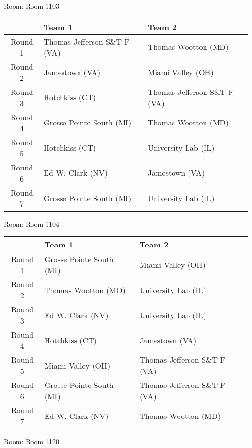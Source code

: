 \documentclass{article}%
\begin{document}
\vspace*{8pt}%
\linebreak%
\begin{flushleft}%
\begin{Large}%
Room: Room 1103%
\end{Large}%
\end{flushleft}%
\begin{tabularx}{\textwidth}{|c|Y|Y|}%
\hline%
&Team 1&Team 2\\%
\hline%
Round 1&Thomas Jefferson S\&T F (VA)&Thomas Wootton (MD)\\%
Round 2&Jamestown (VA)&Miami Valley (OH)\\%
Round 3&Hotchkiss (CT)&Thomas Jefferson S\&T F (VA)\\%
Round 4&Grosse Pointe South (MI)&Thomas Wootton (MD)\\%
Round 5&Hotchkiss (CT)&University Lab (IL)\\%
Round 6&Ed W. Clark (NV)&Jamestown (VA)\\%
Round 7&Grosse Pointe South (MI)&University Lab (IL)\\%
\hline%
\end{tabularx}%
\vspace*{8pt}%
\linebreak%
\begin{flushleft}%
\begin{Large}%
Room: Room 1104%
\end{Large}%
\end{flushleft}%
\begin{tabularx}{\textwidth}{|c|Y|Y|}%
\hline%
&Team 1&Team 2\\%
\hline%
Round 1&Grosse Pointe South (MI)&Miami Valley (OH)\\%
Round 2&Thomas Wootton (MD)&University Lab (IL)\\%
Round 3&Ed W. Clark (NV)&University Lab (IL)\\%
Round 4&Hotchkiss (CT)&Jamestown (VA)\\%
Round 5&Miami Valley (OH)&Thomas Jefferson S\&T F (VA)\\%
Round 6&Grosse Pointe South (MI)&Thomas Jefferson S\&T F (VA)\\%
Round 7&Ed W. Clark (NV)&Thomas Wootton (MD)\\%
\hline%
\end{tabularx}%
\vspace*{8pt}%
\linebreak%
\begin{flushleft}%
\begin{Large}%
Room: Room 1120%
\end{Large}%
\end{flushleft}%
\end{document}
